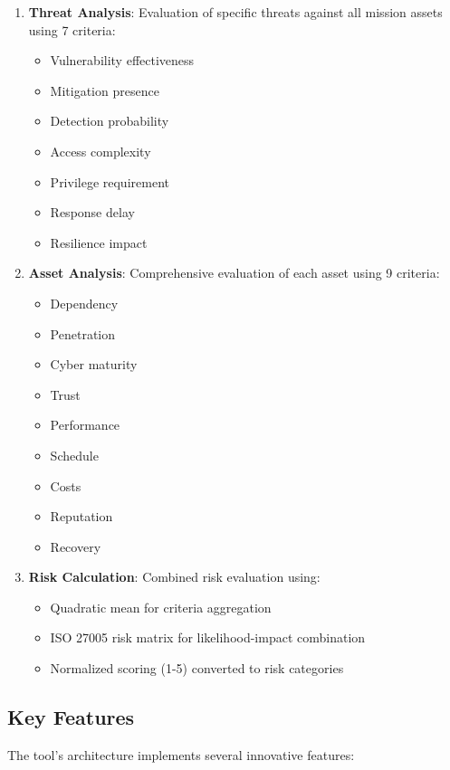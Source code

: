 \documentclass[binding=0.6cm]{sapthesis}
\begin{document}
\begin{enumerate}
\item \textbf{Threat Analysis}: Evaluation of specific threats against all mission assets using 7 criteria:
\begin{itemize}
\item Vulnerability effectiveness
\item Mitigation presence
\item Detection probability
\item Access complexity
\item Privilege requirement
\item Response delay
\item Resilience impact
\end{itemize}

\item \textbf{Asset Analysis}: Comprehensive evaluation of each asset using 9 criteria:
\begin{itemize}
    \item Dependency
    \item Penetration
    \item Cyber maturity
    \item Trust
    \item Performance
    \item Schedule
    \item Costs
    \item Reputation
    \item Recovery
\end{itemize}

\item \textbf{Risk Calculation}: Combined risk evaluation using:
\begin{itemize}
    \item Quadratic mean for criteria aggregation
    \item ISO 27005 risk matrix for likelihood-impact combination
    \item Normalized scoring (1-5) converted to risk categories
\end{itemize}
\end{enumerate}

\subsection{Key Features}

The tool's architecture implements several innovative features:
\end{document}
